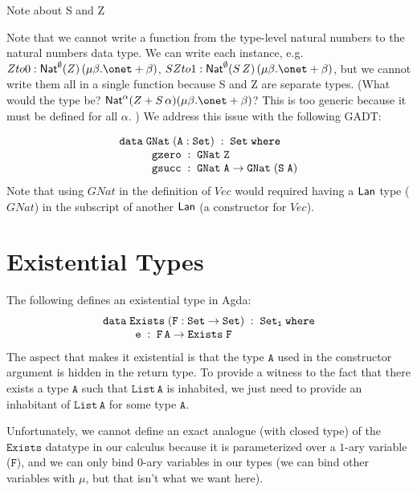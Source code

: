 \documentclass[acmsmall,review,anonymous]{acmart}
\theoremstyle{definition}
\newcommand{\nats}{\mu \beta. \onet + \beta}
\begin{document}
{\color{red} Note about S and Z }


Note that we cannot write a function 
from the type-level natural numbers to 
the natural numbers data type. We 
can write each instance, e.g. $Zto0 : \Nat^{\emptyset} (Z) \, (\nats)$,
$SZto1 : \Nat^{\emptyset} (S\,Z) \, (\nats)$, but we cannot 
write them all in a single function because S and Z are separate types. 
(What would the type be? $\Nat^{\alpha} (Z + S \,\alpha) (\nats)$? This is too 
generic because it must be defined for all $\alpha$. )
We address this issue with the following GADT:

\[\begin{array}{l}
\mathtt{data\; GNat\;(A : Set)\;:\;Set\;where}\\
\hspace*{0.4in}\mathtt{gzero\;:\; GNat\;Z}\\
  \hspace*{0.4in}\mathtt{gsucc\;:\;GNat\;A \rightarrow GNat\;(S\;A)}
\end{array}\]
Note that using $\mathit{GNat}$ in the definition of $\mathit{Vec}$ 
would required having a $\mathsf{Lan}$ type ($\mathit{GNat}$) in the subscript of another $\mathsf{Lan}$
(a constructor for $\mathit{Vec}$).

\section{Existential Types} 
The following defines an existential type in Agda:
\[\begin{array}{l}
\mathtt{data\; Exists \;(F : Set \rightarrow Set)\;:\;Set_1\;where}\\
\hspace*{0.4in}\mathtt{e\;:\; F \,A \rightarrow Exists\;F}\\
\end{array}\]
The aspect that makes it existential is that the type $\mathtt{A}$ used in the constructor argument is hidden in the return type.
To provide a witness to the fact that there exists a type $\mathtt{A}$ such that $\mathtt{List\, A}$
is inhabited, we just need to provide an inhabitant of $\mathtt{List \, A}$ for some type $\mathtt{A}$.

Unfortunately, we cannot define an exact analogue (with closed type) 
of the $\mathtt{Exists}$ datatype in our calculus because it is parameterized over a $1$-ary variable ($\mathtt{F}$),
and we can only bind 0-ary variables in our types (we can bind other variables with $\mu$, but that isn't what we want here).
\end{document}
